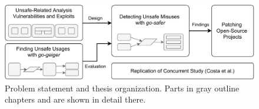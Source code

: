 \begin{figure}[htp!]
    \includegraphics[width=\textwidth]{assets/figures/chapter1/outline1.pdf}
    \caption[Problem statement and thesis organization]
    {Problem statement and thesis organization. \newline Parts in gray outline chapters and are shown in detail there.}
    \label{fig:outline1}
\end{figure}
